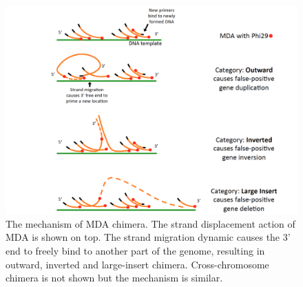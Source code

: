 


\begin{figure}
\centering
\includegraphics[keepaspectratio,width=1\textwidth]{./figures/ChimeraMechanism}
\caption[The mechanism of MDA chimera]{The mechanism of MDA chimera. The strand displacement action of MDA is shown on top. The strand migration dynamic causes the 3' end to freely bind to another part of the genome, resulting in outward, inverted and large-insert chimera. Cross-chromosome chimera is not shown but the mechanism is similar.}
\label{fig:chimeraMech}
\end{figure}

